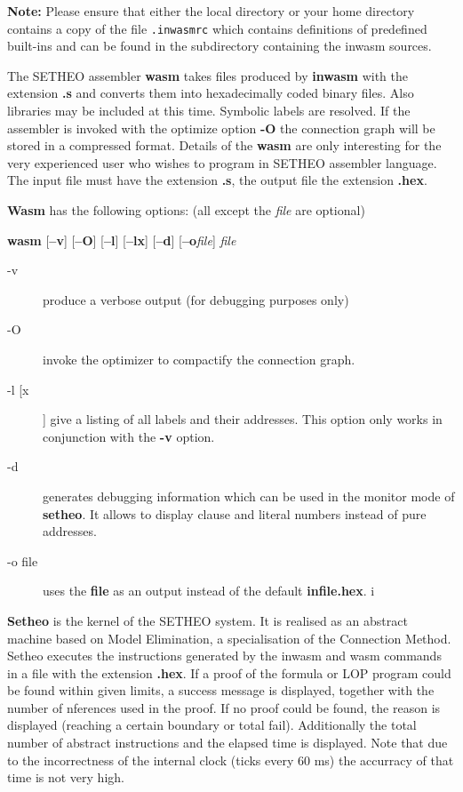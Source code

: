 {\bf Note:} Please ensure that either the local directory or your home
directory contains a copy of the file  \verb-.inwasmrc- which contains
definitions of predefined built-ins and can be found in the subdirectory
containing the inwasm sources.






The SETHEO assembler {\bf wasm} takes files produced by {\bf inwasm}
with the extension {\bf .s} and converts them into hexadecimally coded
binary files. Also libraries may be included at this time. Symbolic labels
are resolved. If the assembler is invoked with the optimize option {\bf -O}
the connection graph will be stored in a compressed format.
Details of the {\bf wasm} are only interesting for the very experienced
user who wishes to program in SETHEO assembler language. 
The input file must have the extension {\bf .s\/}, the output file
the extension {\bf .hex\/}.

{\bf Wasm} has the following options:
(all except the {\it file\/} are optional)

\begin{center}
{\bf wasm}
[{\bf --v}]
[{\bf --O}]
[{\bf --l}]
[{\bf --lx}]
[{\bf --d}]
[{\bf --o\/}{\it file\/}]
{\it file\/}
\end{center}
\begin{description}
\item[-v]
produce a verbose output (for debugging purposes only)
\item[-O]
invoke the optimizer to compactify the connection graph.
\item[-l [x ]]
give a listing of all labels and their addresses. This option only
works in conjunction with the {\bf -v} option.
\item[-d]
generates debugging information which can be used in the monitor
mode of {\bf setheo}. It allows to display clause and literal numbers
instead of pure addresses.
\item[-o file]
uses the {\bf file} as an output instead of the default {\bf infile.hex}.
i\end{description}

{\bf Setheo} is the kernel of the {\small SETHEO} system. It is realised
as an abstract machine
based on Model Elimination, a specialisation of the Connection Method.
Setheo executes the instructions generated by the inwasm and wasm commands
in a file with the extension {\bf .hex}.
If a proof of the formula or LOP program could be found within given limits,
a success message is displayed, together with the number of
nferences used in the proof. If no proof could be found,
the reason is displayed (reaching a certain boundary or total fail).
Additionally the total number of abstract instructions and the
elapsed time is displayed. Note
that due to the incorrectness of the internal clock (ticks every 60 ms)
the accurracy of that time is not very high. 

